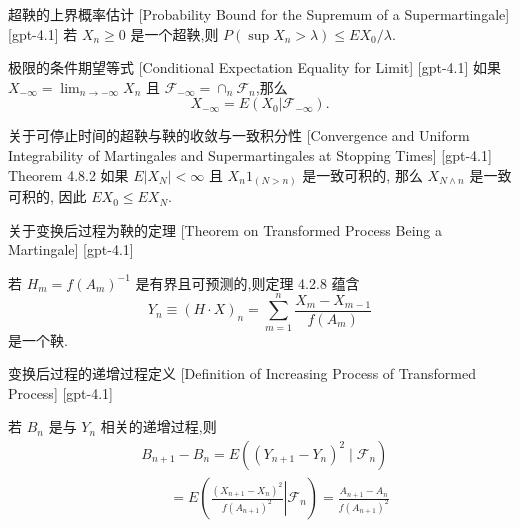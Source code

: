 \documentclass[UTF8]{ctexart}
\begin{document}
    \begin{thm}
        {超鞅的上界概率估计}
        [Probability Bound for the Supremum of a Supermartingale]
        [gpt-4.1]
        若 $X_n \geq 0$ 是一个超鞅,则 $P(\sup X_n > \lambda) \leq E X_0 / \lambda$.
    \end{thm}
    
    
    
    \begin{thm}
        {极限的条件期望等式}
        [Conditional Expectation Equality for Limit]
        [gpt-4.1]
        如果 $X_{-\infty} = \lim_{n \to -\infty} X_{n}$ 且 ${\mathcal{F}}_{-\infty} = \cap_{n} {\mathcal{F}}_{n}$,那么
\[
X_{-\infty} = E(X_{0} | \mathcal{F}_{-\infty}) .
\]

    \end{thm}
    
    
    
    \begin{thm}
        {关于可停止时间的超鞅与鞅的收敛与一致积分性}
        [Convergence and Uniform Integrability of Martingales and Supermartingales at Stopping Times]
        [gpt-4.1]
        Theorem 4.8.2 如果 $E|X_{N}| < \infty$ 且 $X_{n} 1_{(N > n)}$ 是一致可积的, 那么 $X_{N \wedge n}$ 是一致可积的, 因此 $E X_{0} \leq E X_{N}$.
    \end{thm}
    
    
    
    \begin{thm}
        {关于变换后过程为鞅的定理}
        [Theorem on Transformed Process Being a Martingale]
        [gpt-4.1]
        
若 $H_m = f(A_m)^{-1}$ 是有界且可预测的,则定理 4.2.8 蕴含
\[
Y_n \equiv (H \cdot X)_n = \sum_{m=1}^n \frac{X_m - X_{m-1}}{f(A_m)}
\]
是一个鞅.

    \end{thm}
    
    
    
    \begin{dfn}
        {变换后过程的递增过程定义}
        [Definition of Increasing Process of Transformed Process]
        [gpt-4.1]
        
若 $B_n$ 是与 $Y_n$ 相关的递增过程,则
\[
\begin{array}{rl}
& B_{n+1} - B_n = E\left( (Y_{n+1} - Y_n)^2 \mid \mathcal{F}_n \right) \\
& \qquad = E\left( \left. \frac{(X_{n+1} - X_n)^2}{f(A_{n+1})^2} \right| \mathcal{F}_n \right) = \frac{A_{n+1} - A_n}{f(A_{n+1})^2}
\end{array}
\]

    \end{dfn}
    
\end{document}
